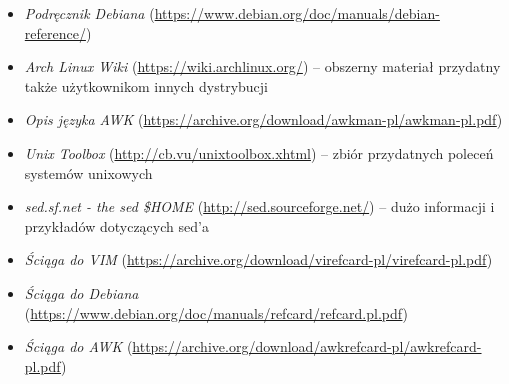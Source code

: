 % 
% 
% 
% 

\begin{itemize}
\item \emph{Podręcznik Debiana} (\url{https://www.debian.org/doc/manuals/debian-reference/})
\item \emph{Arch Linux Wiki} (\url{https://wiki.archlinux.org/}) – obszerny materiał przydatny także użytkownikom innych dystrybucji
\item \emph{Opis języka AWK} (\url{https://archive.org/download/awkman-pl/awkman-pl.pdf})

\item \emph{Unix Toolbox} (\url{http://cb.vu/unixtoolbox.xhtml}) – zbiór przydatnych poleceń systemów unixowych
\item \emph{sed.sf.net - the sed \$HOME} (\url{http://sed.sourceforge.net/}) – dużo informacji i przykładów dotyczących sed'a

\item \emph{Ściąga do VIM} (\url{https://archive.org/download/virefcard-pl/virefcard-pl.pdf})
\item \emph{Ściąga do Debiana} (\url{https://www.debian.org/doc/manuals/refcard/refcard.pl.pdf})
\item \emph{Ściąga do AWK} (\url{https://archive.org/download/awkrefcard-pl/awkrefcard-pl.pdf})
\end{itemize}
